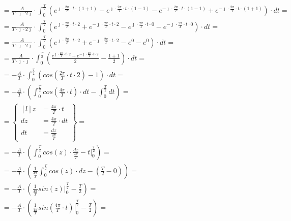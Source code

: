 \begin{task}
\begin{align*}
&=\frac{A}{T\cdot \jmath \cdot 2\jmath} \cdot \int_{0}^{\frac{T}{2}} \left(e^{\jmath \cdot \frac{2\pi}{T} \cdot t \cdot \left(1+1\right)} - e^{\jmath \cdot \frac{2\pi}{T} \cdot t \cdot \left(1 - 1\right)} - e^{-\jmath \cdot \frac{2\pi}{T} \cdot t \cdot \left(1 -1\right)} + e^{-\jmath \cdot \frac{2\pi}{T} \cdot t \cdot \left(1+1\right)} \right) \cdot dt=\\
&=\frac{A}{T\cdot\jmath\cdot 2\jmath} \cdot \int_{0}^{\frac{T}{2}} \left(e^{\jmath \cdot \frac{2\pi}{T} \cdot t \cdot 2} + e^{-\jmath \cdot \frac{2\pi}{T} \cdot t \cdot 2} - e^{\jmath \cdot \frac{2\pi}{T} \cdot t \cdot 0} - e^{-\jmath \cdot \frac{2\pi}{T} \cdot t \cdot 0} \right) \cdot dt=\\
&=\frac{A}{T\cdot\jmath\cdot 2\jmath} \cdot \int_{0}^{\frac{T}{2}} \left(e^{\jmath \cdot \frac{2\pi}{T} \cdot t \cdot 2} + e^{-\jmath \cdot \frac{2\pi}{T} \cdot t \cdot 2} - e^{0} - e^{0} \right) \cdot dt=\\
&=\frac{A}{T\cdot \jmath \cdot \jmath} \cdot \int_{0}^{\frac{T}{2}} \left( \frac{e^{\jmath \cdot \frac{2\pi}{T} \cdot t \cdot 2} + e^{-\jmath \cdot \frac{2\pi}{T} \cdot t \cdot 2}}{2} - \frac{1 + 1}{2} \right) \cdot dt=\\
&=-\frac{A}{T} \cdot \int_{0}^{\frac{T}{2}} \left( cos\left( \frac{2\pi}{T} \cdot t \cdot 2 \right) - 1 \right) \cdot dt=\\
&=-\frac{A}{T} \cdot \left( \int_{0}^{\frac{T}{2}} cos\left( \frac{4\pi}{T} \cdot t \right) \cdot dt - \int_{0}^{\frac{T}{2}} dt \right)=\\
&=\begin{Bmatrix*}[l]
z&=\frac{4\pi}{T} \cdot t\\ 
dz&=\frac{4\pi}{T} \cdot dt\\
dt&=\frac{dz}{\frac{4\pi}{T}}
\end{Bmatrix*}=\\
&=-\frac{A}{T} \cdot \left( \int_{0}^{\frac{T}{2}} cos\left( z\right) \cdot \frac{dz}{\frac{4\pi}{T}} - \left. t\right|_{0}^{\frac{T}{2}} \right)=\\
&=-\frac{A}{T} \cdot \left( \frac{1}{\frac{4\pi}{T}} \int_{0}^{\frac{T}{2}} cos\left( z\right) \cdot dz - \left( \frac{T}{2} - 0\right) \right)=\\
&=-\frac{A}{T} \cdot \left( \frac{1}{\frac{4\pi}{T}} \left. sin\left( z\right) \right|_{0}^{\frac{T}{2}} - \frac{T}{2} \right)=\\
&=-\frac{A}{T} \cdot \left( \frac{1}{\frac{4\pi}{T}} \left. sin\left( \frac{4\pi}{T} \cdot t \right) \right|_{0}^{\frac{T}{2}} - \frac{T}{2} \right)=\\

\end{align*}
\end{task}
